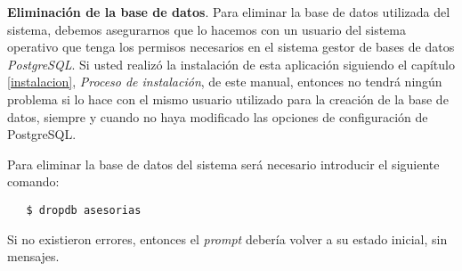 \item \textbf{Eliminación de la base de datos}.
  Para eliminar la base de datos utilizada del sistema, debemos asegurarnos que
  lo hacemos con un usuario del sistema operativo que tenga los permisos
  necesarios en el sistema gestor de bases de datos \textit{PostgreSQL}. Si
  usted realizó la instalación de esta aplicación siguiendo el capítulo
  \ref{instalacion}, \textit{Proceso de instalación}, de este manual, entonces
  no tendrá ningún problema si lo hace con el mismo usuario utilizado para la
  creación de la base de datos, siempre y cuando no haya modificado las opciones
  de configuración de PostgreSQL.

  Para eliminar la base de datos del sistema será necesario introducir el
  siguiente comando:

   \begin{verbatim}
   $ dropdb asesorias
   \end{verbatim}

  Si no existieron errores, entonces el \textit{prompt} debería volver a su
  estado inicial, sin mensajes.